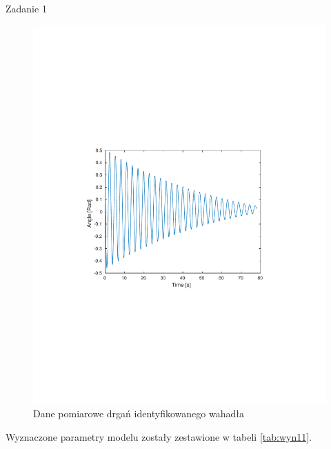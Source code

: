 \documentclass[12pt]{article}
\begin{document}
\begin{section}{Zadanie 1}
    \begin{figure}[!htb]
      \begin{center}
        \includegraphics[width=14cm,trim=3cm 8.5cm 3cm 9cm,clip]
        {../res/img/sys11.pdf}
      \end{center}
      \caption{Dane pomiarowe drgań identyfikowanego wahadła}
      \label{plot:sys11}
    \end{figure}
    
    Wyznaczone parametry modelu zostały zestawione w tabeli \ref{tab:wyn11}.


\end{section}
\end{document}
